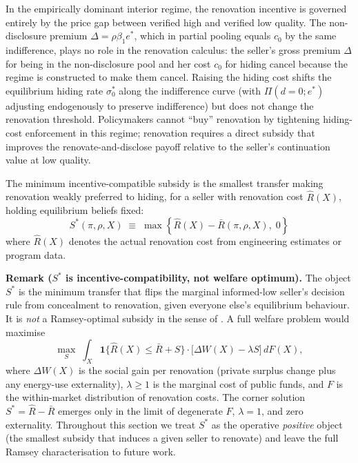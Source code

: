 \documentclass[10pt,letterpaper]{bp-template-concise}
\begin{document}
In the empirically dominant interior regime, the renovation incentive is governed entirely by the price gap between verified high and verified low quality. The non-disclosure premium $\Delta = \rho\beta_1 e^*$, which in partial pooling equals $c_0$ by the same indifference, plays no role in the renovation calculus: the seller's gross premium $\Delta$ for being in the non-disclosure pool and her cost $c_0$ for hiding cancel because the regime is constructed to make them cancel. Raising the hiding cost shifts the equilibrium hiding rate $\sigma_0^*$ along the indifference curve (with $\Pi(d=0;e^*)$ adjusting endogenously to preserve indifference) but does not change the renovation threshold. Policymakers cannot ``buy'' renovation by tightening hiding-cost enforcement in this regime; renovation requires a direct subsidy that improves the renovate-and-disclose payoff relative to the seller's continuation value at low quality.

\begin{definition}
\label{def:minimum_subsidy}
The minimum incentive-compatible subsidy is the smallest transfer making renovation weakly preferred to hiding, for a seller with renovation cost $\hat{R}(X)$, holding equilibrium beliefs fixed:
\begin{equation}
    S^*(\pi,\rho,X)\;\equiv\;\max\!\left\{\hat{R}(X)-\bar{R}(\pi,\rho,X),\;0\right\}
    \label{eq:subsidy}
\end{equation}
where $\hat{R}(X)$ denotes the actual renovation cost from engineering estimates or program data.
\end{definition}

\medskip\noindent\textbf{Remark ($S^*$ is incentive-compatibility, not welfare optimum).}\label{rem:welfare}
The object $S^*$ is the minimum transfer that flips the marginal informed-low seller's decision rule from concealment to renovation, given everyone else's equilibrium behaviour. It is \emph{not} a Ramsey-optimal subsidy in the sense of \citet{ramsey_taxation_1927}. A full welfare problem would maximise
\[
    \max_S \; \int_X \mathbf{1}\{\hat R(X) \le \bar R + S\} \cdot \big[\Delta W(X) - \lambda S\big]\, dF(X),
\]
where $\Delta W(X)$ is the social gain per renovation (private surplus change plus any energy-use externality), $\lambda\ge 1$ is the marginal cost of public funds, and $F$ is the within-market distribution of renovation costs. The corner solution $S^* = \hat R - \bar R$ emerges only in the limit of degenerate $F$, $\lambda=1$, and zero externality. Throughout this section we treat $S^*$ as the operative \emph{positive} object (the smallest subsidy that induces a given seller to renovate) and leave the full Ramsey characterisation to future work.
\end{document}
